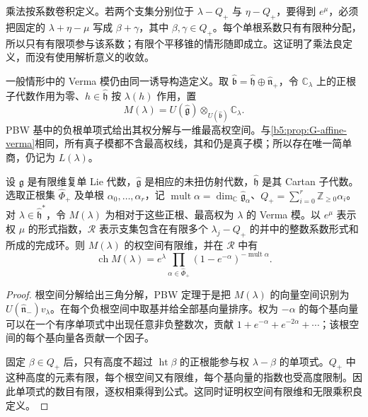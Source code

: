 乘法按系数卷积定义。若两个支集分别位于 \(\lambda-Q_+\) 与 \(\eta-Q_+\)，要得到 \(e^\mu\)，必须把固定的 \(\lambda+\eta-\mu\) 写成 \(\beta+\gamma\)，其中 \(\beta,\gamma\in Q_+\)。每个单根系数只有有限种分配，所以只有有限项参与该系数；有限个平移锥的情形随即成立。这证明了乘法良定义，而没有使用解析意义的收敛。

一般情形中的 Verma 模仍由同一诱导构造定义。取 \(\widehat{\mathfrak b}=\widehat{\mathfrak h}\oplus\widehat{\mathfrak n}_+\)，令 \(\mathbb C_\lambda\) 上的正根子代数作用为零、\(h\in\widehat{\mathfrak h}\) 按 \(\lambda(h)\) 作用，置
\[
	M(\lambda)=U(\widehat{\mathfrak g})\otimes_{U(\widehat{\mathfrak b})}\mathbb C_\lambda.
\]
PBW 基中的负根单项式给出其权分解与一维最高权空间。与\cref{b5:prop:G-affine-verma}相同，所有真子模都不含最高权线，其和仍是真子模；所以存在唯一简单商，仍记为 \(L(\lambda)\)。

\begin{proposition}\label{b5:prop:G-verma-character}
	设 \(\mathfrak g\) 是有限维复单 Lie 代数，\(\widehat{\mathfrak g}\) 是相应的未扭仿射代数，\(\widehat{\mathfrak h}\) 是其 Cartan 子代数。选取正根集 \(\widehat\Phi_+\) 及单根 \(\alpha_0,\ldots,\alpha_r\)，记 \(\operatorname{mult}\alpha=\dim_{\mathbb C}\widehat{\mathfrak g}_\alpha\)、\(Q_+=\sum_{i=0}^r\mathbb Z_{\ge0}\alpha_i\)。对 \(\lambda\in\widehat{\mathfrak h}^*\)，令 \(M(\lambda)\) 为相对于这些正根、最高权为 \(\lambda\) 的 Verma 模。以 \(e^\mu\) 表示权 \(\mu\) 的形式指数，\(\mathscr R\) 表示支集包含在有限多个 \(\lambda_j-Q_+\) 的并中的整数系数形式和所成的完成环。则 \(M(\lambda)\) 的权空间有限维，并在 \(\mathscr R\) 中有
	\begin{equation}\label{b5:eq:G-verma-character}
		\operatorname{ch}M(\lambda)=e^\lambda\prod_{\alpha\in\widehat\Phi_+}
		(1-e^{-\alpha})^{-\operatorname{mult}\alpha}.
	\end{equation}
\end{proposition}
\begin{proof}
	根空间分解给出三角分解，PBW 定理于是把 \(M(\lambda)\) 的向量空间识别为 \(U(\widehat{\mathfrak n}_-)v_\lambda\)。在每个负根空间中取基并给全部基向量排序。权为 \(-\alpha\) 的每个基向量可以在一个有序单项式中出现任意非负整数次，贡献 \(1+e^{-\alpha}+e^{-2\alpha}+\cdots\)；该根空间的每个基向量各贡献一个因子。

	固定 \(\beta\in Q_+\) 后，只有高度不超过 \(\operatorname{ht}\beta\) 的正根能参与权 \(\lambda-\beta\) 的单项式。\(Q_+\) 中这种高度的元素有限，每个根空间又有限维，每个基向量的指数也受高度限制。因此单项式的数目有限，逐权相乘得到公式。这同时证明权空间有限维和无限乘积良定义。
\end{proof}


